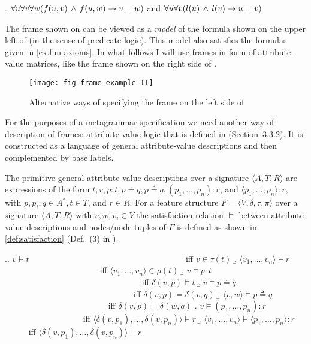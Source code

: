 \ex.\label{ex.fun-axioms}
$\forall u\forall v\forall w(f(u,v)\,\wedge\, f(u,w)\rightarrow v=w)$
\qquad and \qquad
$\forall u\forall v(l(u)\,\wedge\, l(v)\rightarrow u=v)$

The frame shown on  can be viewed
as a \emph{model} of the formula shown on the upper left of  (in the sense of predicate logic). This model also satisfies the formulas given in \ref{ex.fun-axioms}. In what follows I will use frames in form of attribute-value matrices, like the frame shown on the right side of .
%
\begin{figure}
\hfill
\texttt{[image: fig-frame-example-II]}
\hfill
\caption{Alternative ways of specifying the frame on the left side of
}
\label{fig-frame-example-II}
\end{figure}%
%

For the purposes of a metagrammar specification we need another way of description of frames: attribute-value logic that is defined in \citealt{KallmeyerOsswald:13} (Section~3.3.2). It is constructed as a language of general attribute-value descriptions and then complemented by base labels.

The primitive general attribute-value descriptions over a signature $\langle A, T, R \rangle$ are expressions of the form $t, r, p : t, p \doteq q, p \triangleq q, (p_1, \ldots , p_n) : r$, and $\langle p_1, \ldots , p_n \rangle : r$,
with $p, p_i, q \in A^*, t \in T$, and $r \in R$. For a feature structure $F = \langle V, \delta, \tau, \pi \rangle$ over a signature $\langle A, T, R \rangle$ with $v,w, v_i \in V$ the satisfaction relation $\models$ between attribute-value descriptions and nodes/node tuples of $F$ is defined as shown in \ref{def:satisfaction} (Def.~(3) in \citealt{KallmeyerOsswald:13}).

\ex.\label{def:satisfaction}\a. $v \models t$ ~~~~~~~~~~~~~~~~~~~~~~~~~~~~~~~~~~~~ iff $v \in \tau (t)$
\b. $\langle v_1, \ldots , v_n \rangle \models r$ ~~~~~~~~~~~~~~~~~~~~~~ iff $\langle v_1, \ldots , v_n \rangle \in \rho (t)$
\b. $v \models p : t$ ~~~~~~~~~~~~~~~~~~~~~~~~~~~~~~~~ iff $\delta (v, p) \models t$
\b. $v \models p \doteq q$ ~~~~~~~~~~~~~~~~~~~~~~~~~~~~~~ iff $\delta (v, p) = \delta (v, q)$
\b. $\langle v, w \rangle \models p \triangleq q$ ~~~~~~~~~~~~~~~~~~~~~~~~ iff $\delta (v, p) = \delta (w, q)$
\b. $v \models (p_1, \ldots , p_n ) : r$ ~~~~~~~~~~~~~~~~~~ iff $\langle \delta (v, p_1), \ldots , \delta (v, p_n) \rangle \models r$
\b. $\langle v_1, \ldots , v_n \rangle \models \langle p_1, \ldots , p_n \rangle : r$ ~~~~~ iff $\langle \delta (v, p_1), \ldots , \delta (v, p_n) \rangle \models r$

